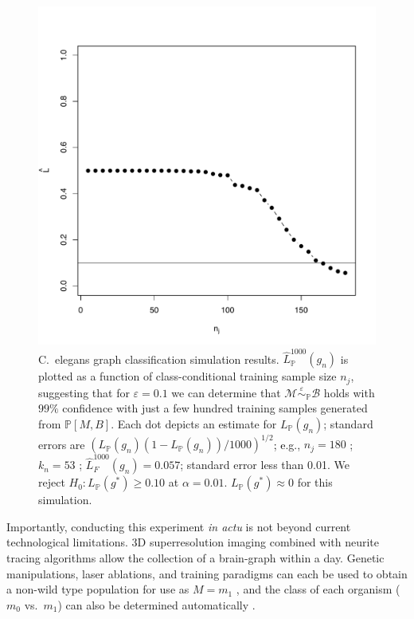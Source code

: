 \documentclass{article}
\newcommand{\mB}{\mathcal{B}}
\newcommand{\mM}{\mathcal{M}}
\newcommand{\PP}{\mathbb{P}}           %
\newcommand{\hL}{\widehat{L}}
\newcommand{\MeB}{\mM \overset{\varepsilon}{{\sim}}_{\PP} \mB}
\providecommand{\tr}[1]{\textcolor{black}{#1}}
\begin{document}
\begin{figure}[!ht]
\centering \includegraphics[width=.5\linewidth]{Lhatplot}
\caption{C.~elegans graph classification simulation results. $\hL^{1000}_{\PP}(g_n)$ is plotted as a function of class-conditional training sample size $n_j$, suggesting that for $\varepsilon=0.1$ we can determine that $\MeB$ holds with $99\%$ confidence with just a few hundred training samples generated from $\PP[M,B]$. Each dot depicts an estimate for $L_{\PP}(g_n)$; standard errors are $(L_{\PP}(g_n)(1-L_{\PP}(g_n))/1000)^{1/2}$\tr{; e}.g., $n_j = 180$ ; $k_n = 53$ ; $\hL^{1000}_{F}(g_n) = 0.057$; standard error less than 0.01. We reject $H_0: L_{\PP}(g^*) \geq 0.10$ at $\alpha=0.01$. $L_{\PP}(g^*) \approx 0$ for this simulation.
}
\label{fig1}
\end{figure}

Importantly, conducting this experiment {\it in actu} is not beyond current technological limitations. 3D superresolution imaging \cite{VaziriShank08} combined with neurite tracing algorithms \cite{HelmstaedterDenk08,Mishchenko09,LuLichtman09} allow the collection of a brain-graph within a day. Genetic manipulations, laser ablations, and training paradigms can each be used to obtain a non-wild type population for use as $M=m_1$ \cite{deBonoMaricq05}, and the class of each organism ($m_0$ vs.~$m_1$) can also be determined automatically \cite{BuckinghamSattelle08}.

\clearpage

\end{document}
